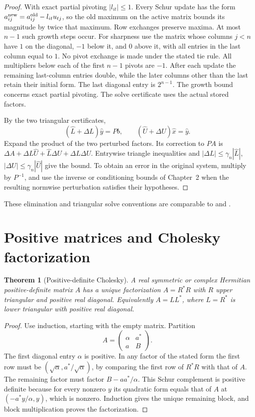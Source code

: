 \documentclass[11pt,oneside,openany]{book}
\theoremstyle{plain}
\newtheorem{theorem}{Theorem}[chapter]
\theoremstyle{definition}
\theoremstyle{remark}
\begin{document}
\begin{proof}
With exact partial pivoting \(|l_{it}|\le1\). Every Schur update
has the form \(a_{ij}^{\rm new}=a_{ij}^{\rm old}-l_{it}u_{tj}\),
so the old maximum on the active matrix bounds its magnitude
by twice that maximum. Row exchanges preserve maxima. At most
\(n-1\) such growth steps occur. For sharpness use the matrix whose
columns \(j<n\) have \(1\) on the diagonal, \(-1\) below it, and
\(0\) above it, with all entries in the last column equal to \(1\).
No pivot exchange is made under the stated tie rule. All
multipliers below each of the first \(n-1\) pivots are \(-1\).
After each update the remaining last-column entries double,
while the later columns other than the last retain their
initial form. The last diagonal entry is \(2^{n-1}\).
The growth bound concerns exact partial pivoting. The solve
certificate uses the actual stored factors.

By the two triangular certificates,
\[
 (\hat L+\Delta L)\hat y=Pb,\qquad
 (\hat U+\Delta U)\hat x=\hat y .
\]
Expand the product of the two perturbed factors. Its correction
to \(PA\) is
\(\Delta A+\Delta L\hat U+\hat L\Delta U+\Delta L\Delta U\).
Entrywise triangle inequalities and
\(|\Delta L|\le\gamma_n|\hat L|\),
\(|\Delta U|\le\gamma_n|\hat U|\) give the bound. To obtain an
error in the original system, multiply by \(P^{-1}\), and use
the inverse or conditioning bounds of Chapter~2 when the
resulting normwise perturbation satisfies their hypotheses.
\end{proof}

These elimination and triangular solve conventions are comparable
to \cite[Chapters~8--9]{higham} and \cite[Sections~3.2--3.4]{golub}.

\section{Positive matrices and Cholesky factorization}

\begin{theorem}[Positive-definite Cholesky]\label{p206:W24}
A real symmetric or complex Hermitian positive-definite matrix
\(A\) has a unique factorization \(A=R^*R\) with \(R\) upper
triangular and positive real diagonal. Equivalently
\(A=LL^*\), where \(L=R^*\) is lower triangular with positive real
diagonal.
\end{theorem}

\begin{proof}
Use induction, starting with the empty matrix. Partition
\[
 A=\begin{pmatrix}\alpha&a^*\\a&B\end{pmatrix}.
\]
The first diagonal entry \(\alpha\) is positive. In any factor
of the stated form the first row must be
\((\sqrt{\alpha},a^*/\sqrt{\alpha})\), by comparing the first
row of \(R^*R\) with that of \(A\). The remaining factor must
factor \(B-aa^*/\alpha\). This Schur complement is positive
definite because for every nonzero \(y\) its quadratic form
equals that of \(A\) at \((-a^*y/\alpha,y)\), which is nonzero.
Induction gives the unique remaining block, and block
multiplication proves the factorization.
\end{proof}
\end{document}
